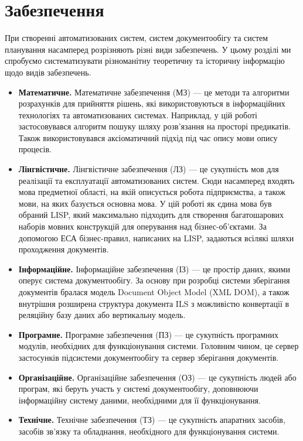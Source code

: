 \documentclass{memoir}
\begin{document}
\section{Забезпечення}

При створенні автоматизованих систем, систем документообігу та систем планування насамперед розрізняють різні види забезпечень. У цьому розділі ми спробуємо систематизувати різноманітну теоретичну та історичну інформацію щодо видів забезпечень.

\begin{itemize}
    \item \textbf{Математичне.} Математичне забезпечення (МЗ) — це методи та алгоритми розрахунків для прийняття рішень, які використовуються в інформаційних технологіях та автоматизованих системах. Наприклад, у цій роботі застосовувався алгоритм пошуку шляху розв’язання на просторі предикатів. Також використовувався аксіоматичний підхід під час опису мови опису процесів.
    \item \textbf{Лінгвістичне.} Лінгвістичне забезпечення (ЛЗ) — це сукупність мов для реалізації та експлуатації автоматизованих систем. Сюди насамперед входять мова предметної області, на якій описується робота підприємства, а також мови, на яких базується основна мова. У цій роботі як єдина мова був обраний LISP, який максимально підходить для створення багатошарових наборів мовних конструкцій для оперування над бізнес-об’єктами. За допомогою ЕСА бізнес-правил, написаних на LISP, задаються всілякі шляхи проходження документів.
    \item \textbf{Інформаційне.} Інформаційне забезпечення (ІЗ) — це простір даних, якими оперує система документообігу. За основу при розробці системи зберігання документів бралася модель Document Object Model (XML DOM), а також внутрішня розширена структура документа ILS з можливістю конвертації в реляційну базу даних або вертикальну модель.
    \item \textbf{Програмне.} Програмне забезпечення (ПЗ) — це сукупність програмних модулів, необхідних для функціонування системи. Головним чином, це сервер застосунків підсистеми документообігу та сервер зберігання документів.
    \item \textbf{Організаційне.} Організаційне забезпечення (ОЗ) — це сукупність людей або програм, які беруть участь у системі документообігу, доповнюючи інформаційну систему даними, необхідними для її функціонування.
    \item \textbf{Технічне.} Технічне забезпечення (ТЗ) — це сукупність апаратних засобів, засобів зв’язку та обладнання, необхідного для функціонування системи.
\end{itemize}
\end{document}
